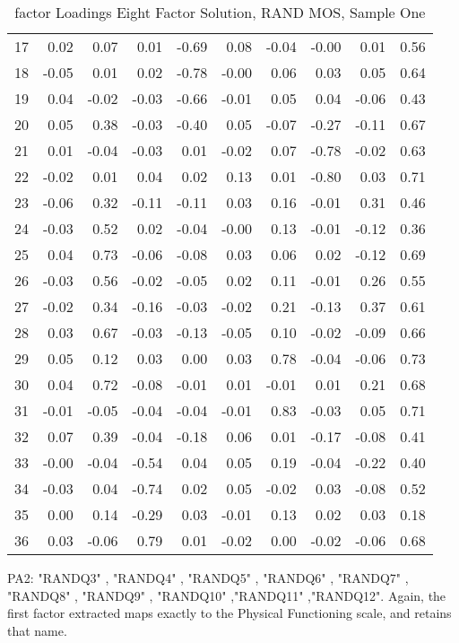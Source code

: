 \documentclass{article}
\begin{document}
\begin{table}[ht]
\begin{tabular}{rrrrrrrrrr}
  17 & 0.02 & 0.07 & 0.01 & -0.69 & 0.08 & -0.04 & -0.00 & 0.01 & 0.56 \\ 
  18 & -0.05 & 0.01 & 0.02 & -0.78 & -0.00 & 0.06 & 0.03 & 0.05 & 0.64 \\ 
  19 & 0.04 & -0.02 & -0.03 & -0.66 & -0.01 & 0.05 & 0.04 & -0.06 & 0.43 \\ 
  20 & 0.05 & 0.38 & -0.03 & -0.40 & 0.05 & -0.07 & -0.27 & -0.11 & 0.67 \\ 
  21 & 0.01 & -0.04 & -0.03 & 0.01 & -0.02 & 0.07 & -0.78 & -0.02 & 0.63 \\ 
  22 & -0.02 & 0.01 & 0.04 & 0.02 & 0.13 & 0.01 & -0.80 & 0.03 & 0.71 \\ 
  23 & -0.06 & 0.32 & -0.11 & -0.11 & 0.03 & 0.16 & -0.01 & 0.31 & 0.46 \\ 
  24 & -0.03 & 0.52 & 0.02 & -0.04 & -0.00 & 0.13 & -0.01 & -0.12 & 0.36 \\ 
  25 & 0.04 & 0.73 & -0.06 & -0.08 & 0.03 & 0.06 & 0.02 & -0.12 & 0.69 \\ 
  26 & -0.03 & 0.56 & -0.02 & -0.05 & 0.02 & 0.11 & -0.01 & 0.26 & 0.55 \\ 
  27 & -0.02 & 0.34 & -0.16 & -0.03 & -0.02 & 0.21 & -0.13 & 0.37 & 0.61 \\ 
  28 & 0.03 & 0.67 & -0.03 & -0.13 & -0.05 & 0.10 & -0.02 & -0.09 & 0.66 \\ 
  29 & 0.05 & 0.12 & 0.03 & 0.00 & 0.03 & 0.78 & -0.04 & -0.06 & 0.73 \\ 
  30 & 0.04 & 0.72 & -0.08 & -0.01 & 0.01 & -0.01 & 0.01 & 0.21 & 0.68 \\ 
  31 & -0.01 & -0.05 & -0.04 & -0.04 & -0.01 & 0.83 & -0.03 & 0.05 & 0.71 \\ 
  32 & 0.07 & 0.39 & -0.04 & -0.18 & 0.06 & 0.01 & -0.17 & -0.08 & 0.41 \\ 
  33 & -0.00 & -0.04 & -0.54 & 0.04 & 0.05 & 0.19 & -0.04 & -0.22 & 0.40 \\ 
  34 & -0.03 & 0.04 & -0.74 & 0.02 & 0.05 & -0.02 & 0.03 & -0.08 & 0.52 \\ 
  35 & 0.00 & 0.14 & -0.29 & 0.03 & -0.01 & 0.13 & 0.02 & 0.03 & 0.18 \\ 
  36 & 0.03 & -0.06 & 0.79 & 0.01 & -0.02 & 0.00 & -0.02 & -0.06 & 0.68 \\ 
   \hline
\end{tabular}
\caption{factor Loadings Eight Factor Solution, RAND MOS, Sample One} 
\label{tab:tcq1rand8fact}
\end{table}
PA2: "RANDQ3" , "RANDQ4" , "RANDQ5" , "RANDQ6" , "RANDQ7" , "RANDQ8" , "RANDQ9" , "RANDQ10" ,"RANDQ11" ,"RANDQ12". Again, the first factor extracted maps exactly to the Physical Functioning scale, and retains that name. 
\end{document}
